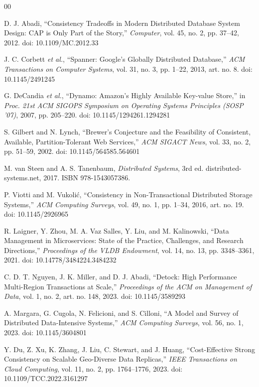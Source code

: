 \documentclass[conference]{IEEEtran}
\begin{document}
\begin{thebibliography}{00}

 D. J. Abadi, ``Consistency Tradeoffs in Modern Distributed Database System Design: CAP is Only Part of the Story,'' \emph{Computer}, vol. 45, no. 2, pp. 37--42, 2012. doi: 10.1109/MC.2012.33

 J. C. Corbett \emph{et al.}, ``Spanner: Google's Globally Distributed Database,'' \emph{ACM Transactions on Computer Systems}, vol. 31, no. 3, pp. 1--22, 2013, art. no. 8. doi: 10.1145/2491245

 G. DeCandia \emph{et al.}, ``Dynamo: Amazon's Highly Available Key-value Store,'' in \emph{Proc. 21st ACM SIGOPS Symposium on Operating Systems Principles (SOSP '07)}, 2007, pp. 205--220. doi: 10.1145/1294261.1294281

 S. Gilbert and N. Lynch, ``Brewer's Conjecture and the Feasibility of Consistent, Available, Partition-Tolerant Web Services,'' \emph{ACM SIGACT News}, vol. 33, no. 2, pp. 51--59, 2002. doi: 10.1145/564585.564601

 M. van Steen and A. S. Tanenbaum, \emph{Distributed Systems}, 3rd ed. distributed-systems.net, 2017. ISBN 978-1543057386.

 P. Viotti and M. Vukoli\'c, ``Consistency in Non-Transactional Distributed Storage Systems,'' \emph{ACM Computing Surveys}, vol. 49, no. 1, pp. 1--34, 2016, art. no. 19. doi: 10.1145/2926965

 R. Laigner, Y. Zhou, M. A. Vaz Salles, Y. Liu, and M. Kalinowski, ``Data Management in Microservices: State of the Practice, Challenges, and Research Directions,'' \emph{Proceedings of the VLDB Endowment}, vol. 14, no. 13, pp. 3348--3361, 2021. doi: 10.14778/3484224.3484232

 C. D. T. Nguyen, J. K. Miller, and D. J. Abadi, ``Detock: High Performance Multi-Region Transactions at Scale,'' \emph{Proceedings of the ACM on Management of Data}, vol. 1, no. 2, art. no. 148, 2023. doi: 10.1145/3589293

 A. Margara, G. Cugola, N. Felicioni, and S. Cilloni, ``A Model and Survey of Distributed Data-Intensive Systems,'' \emph{ACM Computing Surveys}, vol. 56, no. 1, 2023. doi: 10.1145/3604801

 Y. Du, Z. Xu, K. Zhang, J. Liu, C. Stewart, and J. Huang, ``Cost-Effective Strong Consistency on Scalable Geo-Diverse Data Replicas,'' \emph{IEEE Transactions on Cloud Computing}, vol. 11, no. 2, pp. 1764--1776, 2023. doi: 10.1109/TCC.2022.3161297

\end{thebibliography}
\end{document}
